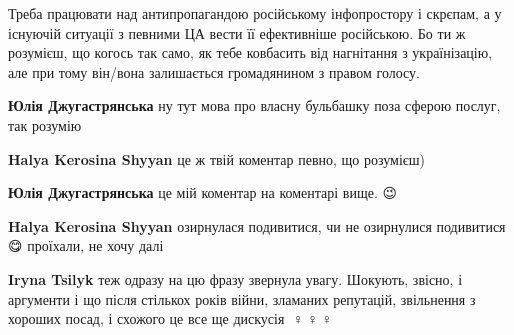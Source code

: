 \begin{itemize}
\begin{itemize}
Треба працювати над антипропагандою російському інфопростору і скрєпам, а у
існуючій ситуації з певними ЦА вести її ефективніше російською. Бо ти ж
розумієш, що когось так само, як тебе ковбасить від нагнітання з українізацію,
але при тому він/вона залишається громадянином з правом голосу.

 

\textbf{Юлія Джугастрянська} ну тут мова про власну бульбашку поза сферою послуг, так розумію

 
\textbf{Halya Kerosina Shyyan} це ж твій коментар \Smiley[1.0][yellow] певно, що розумієш)

 

\textbf{Юлія Джугастрянська} це мій коментар на коментарі вище. 😉

 
\textbf{Halya Kerosina Shyyan} озирнулася подивитися, чи не озирнулися подивитися 😋 проїхали, не хочу далі

 
\textbf{Iryna Tsilyk} теж одразу на цю фразу звернула увагу. Шокують, звісно, і аргументи і що після стількох років війни, зламаних репутацій, звільнення з хороших посад, і схожого це все ще дискусія 🤷♀️🤷♀️🤷♀️

 

\end{itemize}
\end{itemize}
